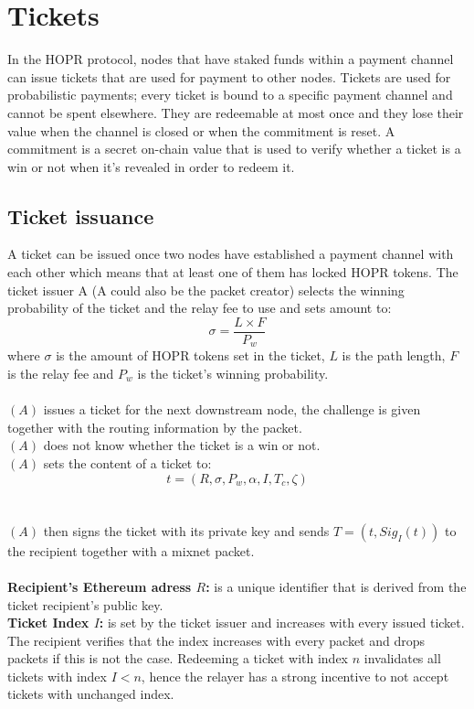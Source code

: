 \section{Tickets}
\label{ticket}
In the HOPR protocol, nodes that have staked funds within a payment channel can issue tickets that are used for payment to other nodes.
Tickets are used for probabilistic payments; every ticket is bound to a specific payment channel and cannot be spent elsewhere.
They are redeemable at most once and they lose their value when the channel is closed or when the commitment is reset. A commitment is a secret on-chain value that is used to verify whether a ticket is a win or not when it's revealed in order to redeem it.
\subsection{Ticket issuance}
A ticket can be issued once two nodes have established a payment channel with each other which means that at least one of them has locked HOPR tokens.
\newline The ticket issuer A (A could also be the packet creator) selects the winning probability of the ticket and the relay fee to use and sets amount to:
$$\sigma=\dfrac{L\times F}{P_w}$$
where $\sigma$ is the amount of HOPR tokens set in the ticket, $L$ is the path length, $F$ is the relay fee and $P_w$ is the ticket's winning probability.
\\~\\$(A)$ issues a ticket for the next downstream node,
the challenge is given together with the routing information by the packet.
\\$(A)$ does not know whether the ticket is a win or not.
    \\$(A)$ sets the content of a ticket to: $$t=(R,\sigma,P_w,\alpha,I,T_c,\zeta)$$
\\~\\$(A)$ then signs the ticket with its private key and sends $T= (t, Sig_I(t))$ to the recipient together with a mixnet packet.
    \\~\\\textbf{Recipient's Ethereum adress $R$:} is a unique identifier that is derived from the ticket recipient's public key.
    \\\textbf{Ticket Index $I$:} is set by the ticket issuer and increases with every issued ticket. The recipient verifies that the index increases with every packet and drops packets if this is not the case. Redeeming a ticket with index $n$ invalidates all tickets with index $I<n$, hence the relayer has a strong incentive to not accept tickets with unchanged index.
